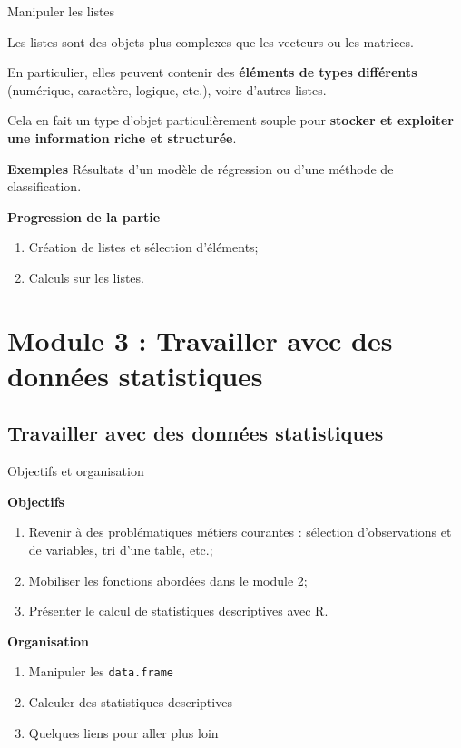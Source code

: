 \documentclass[12pt,ignorenonframetext,]{beamer}
\providecommand{\tightlist}{%
  \setlength{\itemsep}{0pt}\setlength{\parskip}{0pt}}
\newcommand{\aparte}[2]{
	{\small\textsf{\textcolor{redInsee}{\textbf{#1}} #2}}
}
\newcommand{\strong}[1]{\textbf{\textcolor{redInsee}{#1}}}
\begin{document}
\begin{frame}{Manipuler les listes}

Les listes sont des objets plus complexes que les vecteurs ou les
matrices.

\pause En particulier, elles peuvent contenir des \textbf{éléments de
types différents} (numérique, caractère, logique, etc.), voire d'autres
listes.

\pause Cela en fait un type d'objet particulièrement souple pour
\textbf{stocker et exploiter une information riche et structurée}.

\aparte{Exemples}{Résultats d'un modèle de régression ou d'une méthode de classification.}

\pause \bigskip \strong{Progression de la partie}

\begin{enumerate}
\def\labelenumi{\arabic{enumi}.}
\tightlist
\item
  Création de listes et sélection d'éléments;
\item
  Calculs sur les listes.
\end{enumerate}

\end{frame}

\section{Module 3 : Travailler avec des données
statistiques}\label{module-3-travailler-avec-des-donnees-statistiques}

\subsection*{Travailler avec des données
statistiques}\label{travailler-avec-des-donnees-statistiques}

\begin{frame}[fragile]{Objectifs et organisation}

\strong{Objectifs}

\begin{enumerate}
\def\labelenumi{\arabic{enumi}.}
\tightlist
\item
  Revenir à des problématiques métiers courantes : sélection
  d'observations et de variables, tri d'une table, etc.;
\item
  Mobiliser les fonctions abordées dans le module 2;
\item
  Présenter le calcul de statistiques descriptives avec R.
\end{enumerate}

\bigskip \pause \strong{Organisation}

\begin{enumerate}
\def\labelenumi{\arabic{enumi}.}
\item
  Manipuler les \texttt{data.frame}
\item
  Calculer des statistiques descriptives
\item
  Quelques liens pour aller plus loin
\end{enumerate}

\end{frame}
\end{document}
